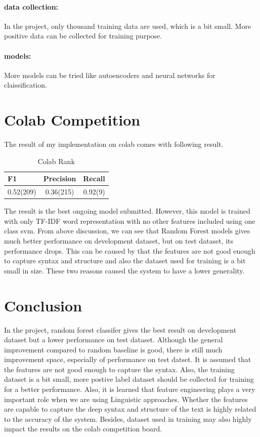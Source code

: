 \documentclass[11pt,a4paper]{article}
\begin{document}
\paragraph{data collection:}
In the project, only thousand training data are used, which is a bit small. More positive data can be collected for training purpose.
\paragraph{models:}
More models can be tried like autoencoders and neural networks for claissification.

\section{Colab Competition}
The result of my implementation on colab comes with following result.
\begin{table}[h!]
  \begin{center}
    \caption{Colab Rank}
    \label{tab:table5}
    \begin{tabular}{l|c|r}
      \textbf{F1} & \textbf{Precision} & \textbf{Recall}\\
      \hline
   0.52(209) & 0.36(215) & 0.92(9)\\
    \end{tabular}
  \end{center}
\end{table}
The result is the best ongoing model submitted. However, this model is trained with only TF-IDF word representation with no other features included using one class svm. From above discussion, we can see that Random Forest models gives much better performance on development dataset, but on test dataset, its performance drops. This can be caused by that the features are not good enough to capture syntax and structure and also the dataset used for training is a bit small in size. These two reasons caused the system to have a lower generality.

\section{Conclusion}
In the project, random forest classifer gives the best result on development dataset but a lower performance on test dataset. Although the general improvement compared to random baseline is good, there is still much improvement space, especially of performance on test datset. It is assumed that the features are not good enough to capture the syntax. Also, the training dataset is a bit small, more postive label dataset should be collected for training for a better performance.
Also, it is learned that feature engineering plays a very important role when we are using Linguistic approaches. Whether the features are capable to capture the deep syntax and structure of the text is highly related to the accuracy of the system. Besides, dataset used in training may also highly impact the results on the colab competition board.
\end{document}
